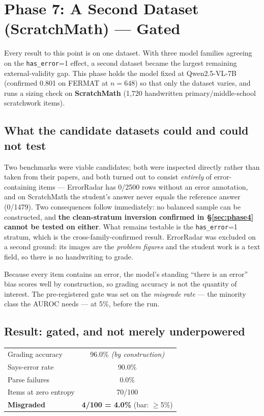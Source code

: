 \documentclass[11pt]{article}
\begin{document}
\section{Phase 7: A Second Dataset (ScratchMath) --- Gated}
\label{sec:phase7}

Every result to this point is on one dataset. With three model families
agreeing on the \texttt{has\_error}=1 effect, a second dataset became the
largest remaining external-validity gap. This phase holds the model fixed
at Qwen2.5-VL-7B (confirmed 0.801 on FERMAT at $n=648$) so that only the
dataset varies, and runs a sizing check on \textbf{ScratchMath} (1{,}720
handwritten primary/middle-school scratchwork items).

\subsection{What the candidate datasets could and could not test}

Two benchmarks were viable candidates; both were inspected directly rather
than taken from their papers, and both turned out to consist
\emph{entirely} of error-containing items --- ErrorRadar has 0/2500 rows
without an error annotation, and on ScratchMath the student's answer never
equals the reference answer (0/1479). Two consequences follow immediately:
no balanced sample can be constructed, and \textbf{the clean-stratum
inversion confirmed in \S\ref{sec:phase4} cannot be tested on either}.
What remains testable is the \texttt{has\_error}=1 stratum, which is the
cross-family-confirmed result. ErrorRadar was excluded on a second ground:
its images are the \emph{problem figures} and the student work is a text
field, so there is no handwriting to grade.

Because every item contains an error, the model's standing ``there is an
error'' bias scores well by construction, so grading accuracy is not the
quantity of interest. The pre-registered gate was set on the
\emph{misgrade rate} --- the minority class the AUROC needs --- at 5\%,
before the run.

\subsection{Result: gated, and not merely underpowered}
\label{sec:phase7-gate}

\begin{center}
\begin{tabular}{lc}
\toprule
Grading accuracy & 96.0\% \emph{(by construction)} \\
Says-error rate & 90.0\% \\
Parse failures & 0.0\% \\
Items at zero entropy & 70/100 \\
\textbf{Misgraded} & \textbf{4/100 = 4.0\%} \quad(bar: $\geq$5\%) \\
\bottomrule
\end{tabular}
\end{center}
\end{document}
